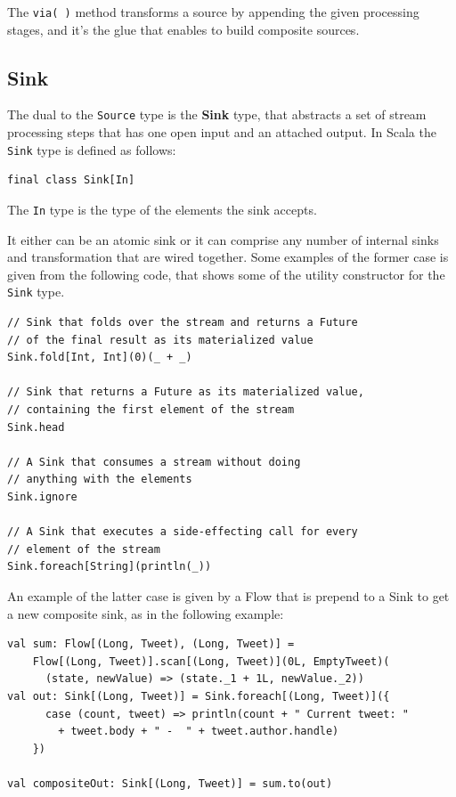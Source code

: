 The \texttt{via(\ )} method transforms a source by appending the given
processing stages, and it's the glue that enables to build composite
sources.


\subsection{Sink}\label{sink}

The dual to the \texttt{Source} type is the \textbf{Sink} type, that
abstracts a set of stream processing steps that has one open input and
an attached output. In Scala the \texttt{Sink} type is defined as
follows:

\begin{verbatim}
final class Sink[In]
\end{verbatim}

The \texttt{In} type is the type of the elements the sink accepts.

It either can be an atomic sink or it can comprise any number of
internal sinks and transformation that are wired together. Some examples
of the former case is given from the following code, that shows some of
the utility constructor for the \texttt{Sink} type.

\begin{verbatim}
// Sink that folds over the stream and returns a Future
// of the final result as its materialized value
Sink.fold[Int, Int](0)(_ + _)

// Sink that returns a Future as its materialized value,
// containing the first element of the stream
Sink.head

// A Sink that consumes a stream without doing 
// anything with the elements
Sink.ignore

// A Sink that executes a side-effecting call for every 
// element of the stream
Sink.foreach[String](println(_))
\end{verbatim}

An example of the latter case is given by a Flow that is prepend to a
Sink to get a new composite sink, as in the following example:

\begin{verbatim}
val sum: Flow[(Long, Tweet), (Long, Tweet)] = 
	Flow[(Long, Tweet)].scan[(Long, Tweet)](0L, EmptyTweet)(
      (state, newValue) => (state._1 + 1L, newValue._2))
val out: Sink[(Long, Tweet)] = Sink.foreach[(Long, Tweet)]({
      case (count, tweet) => println(count + " Current tweet: " 
      	+ tweet.body + " -  " + tweet.author.handle)
    })

val compositeOut: Sink[(Long, Tweet)] = sum.to(out)
\end{verbatim}



